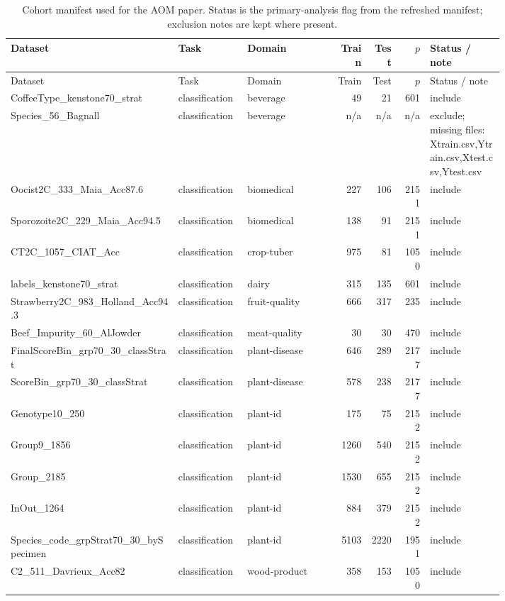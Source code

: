 \begin{longtable}{L{0.34\linewidth}L{0.14\linewidth}L{0.18\linewidth}rrrL{0.15\linewidth}}
\caption{Cohort manifest used for the AOM paper.  Status is the primary-analysis flag from the refreshed manifest; exclusion notes are kept where present.}\\
\toprule
Dataset & Task & Domain & Train & Test & $p$ & Status / note \\
\midrule
\endfirsthead
\toprule
Dataset & Task & Domain & Train & Test & $p$ & Status / note \\
\midrule
\endhead
CoffeeType\_kenstone70\_strat & classification & beverage & 49 & 21 & 601 & include \\
Species\_56\_Bagnall & classification & beverage & n/a & n/a & n/a & exclude; missing files: Xtrain.csv,Ytrain.csv,Xtest.csv,Ytest.csv \\
Oocist2C\_333\_Maia\_Acc87.6 & classification & biomedical & 227 & 106 & 2151 & include \\
Sporozoite2C\_229\_Maia\_Acc94.5 & classification & biomedical & 138 & 91 & 2151 & include \\
CT2C\_1057\_CIAT\_Acc & classification & crop-tuber & 975 & 81 & 1050 & include \\
labels\_kenstone70\_strat & classification & dairy & 315 & 135 & 601 & include \\
Strawberry2C\_983\_Holland\_Acc94.3 & classification & fruit-quality & 666 & 317 & 235 & include \\
Beef\_Impurity\_60\_AlJowder & classification & meat-quality & 30 & 30 & 470 & include \\
FinalScoreBin\_grp70\_30\_classStrat & classification & plant-disease & 646 & 289 & 2177 & include \\
ScoreBin\_grp70\_30\_classStrat & classification & plant-disease & 578 & 238 & 2177 & include \\
Genotype10\_250 & classification & plant-id & 175 & 75 & 2152 & include \\
Group9\_1856 & classification & plant-id & 1260 & 540 & 2152 & include \\
Group\_2185 & classification & plant-id & 1530 & 655 & 2152 & include \\
InOut\_1264 & classification & plant-id & 884 & 379 & 2152 & include \\
Species\_code\_grpStrat70\_30\_bySpecimen & classification & plant-id & 5103 & 2220 & 1951 & include \\
C2\_511\_Davrieux\_Acc82 & classification & wood-product & 358 & 153 & 1050 & include \\

\end{longtable}
